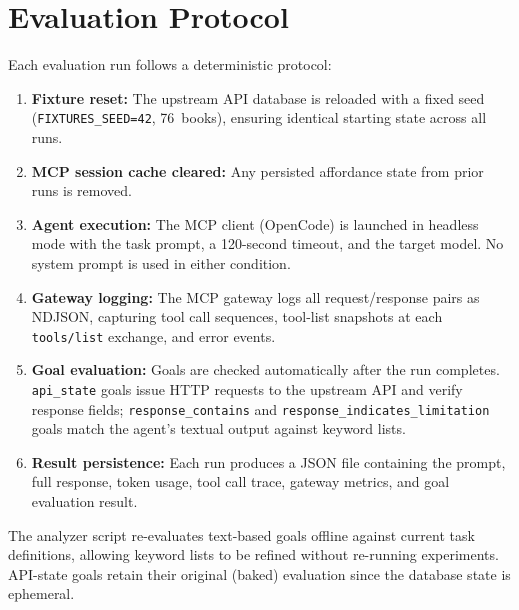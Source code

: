 \documentclass[11pt,a4paper]{article}
\begin{document}
\section{Evaluation Protocol}
\label{appendix:protocol}

Each evaluation run follows a deterministic protocol:

\begin{enumerate}
  \item \textbf{Fixture reset:} The upstream API database is reloaded with a fixed seed (\texttt{FIXTURES\_SEED=42}, 76~books), ensuring identical starting state across all runs.
  \item \textbf{MCP session cache cleared:} Any persisted affordance state from prior runs is removed.
  \item \textbf{Agent execution:} The MCP client (OpenCode) is launched in headless mode with the task prompt, a 120-second timeout, and the target model. No system prompt is used in either condition.
  \item \textbf{Gateway logging:} The MCP gateway logs all request/response pairs as NDJSON, capturing tool call sequences, tool-list snapshots at each \texttt{tools/list} exchange, and error events.
  \item \textbf{Goal evaluation:} Goals are checked automatically after the run completes. \texttt{api\_state} goals issue HTTP requests to the upstream API and verify response fields; \texttt{response\_contains} and \texttt{response\_indicates\_limitation} goals match the agent's textual output against keyword lists.
  \item \textbf{Result persistence:} Each run produces a JSON file containing the prompt, full response, token usage, tool call trace, gateway metrics, and goal evaluation result.
\end{enumerate}

The analyzer script re-evaluates text-based goals offline against current task definitions, allowing keyword lists to be refined without re-running experiments. API-state goals retain their original (baked) evaluation since the database state is ephemeral.
\end{document}
